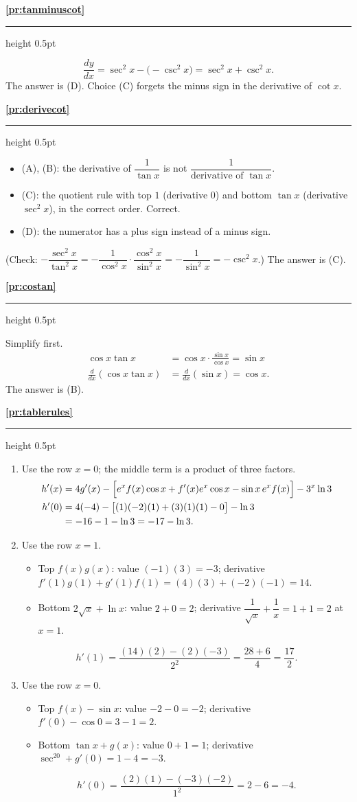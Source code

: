 \documentclass[11pt,a4paper]{article}
\newcommand{\solitem}[2]{%
 \par\addvspace{16pt}\Needspace{10\baselineskip}%
 {\large\bfseries \ref{#1}}\par\nobreak\vspace{2pt}%
 {\color{rulegray}\hrule height 0.5pt}\nobreak\vspace{7pt}%
 #2\par}
\begin{document}
\solitem{pr:tanminuscot}{%
\[
\frac{dy}{dx}=\sec^2x-\bigl(-\csc^2x\bigr)=\sec^2x+\csc^2x.
\]
The answer is (D). Choice (C) forgets the minus sign in the derivative of $\cot x$.
}

\solitem{pr:derivecot}{%
\begin{itemize}
 \item (A), (B): the derivative of $\dfrac{1}{\tan x}$ is not $\dfrac{1}{\text{derivative of }\tan x}$.
 \item (C): the quotient rule with top $1$ (derivative $0$) and bottom $\tan x$ (derivative $\sec^2x$), in the correct order. Correct.
 \item (D): the numerator has a plus sign instead of a minus sign.
\end{itemize}
(Check: $-\dfrac{\sec^2x}{\tan^2x}=-\dfrac{1}{\cos^2x}\cdot\dfrac{\cos^2x}{\sin^2x}=-\dfrac{1}{\sin^2x}=-\csc^2x$.) The answer is (C).
}

\solitem{pr:costan}{%
Simplify first.
\begin{align*}
\cos x\tan x&=\cos x\cdot\frac{\sin x}{\cos x}=\sin x\\
\frac{d}{dx}(\cos x\tan x)&=\frac{d}{dx}(\sin x)=\cos x.
\end{align*}
The answer is (B).
}

\solitem{pr:tablerules}{%
\begin{enumerate}[label=(\alph*)]
 \item Use the row $x=0$; the middle term is a product of three factors.
 \begin{align*}
 h'(x)&=4g'(x)-\Bigl[e^xf(x)\cos x+f'(x)e^x\cos x-\sin x\,e^xf(x)\Bigr]-3^x\ln3\\
 h'(0)&=4(-4)-\bigl[(1)(-2)(1)+(3)(1)(1)-0\bigr]-\ln3\\
 &=-16-1-\ln3=-17-\ln3.
 \end{align*}
 \item Use the row $x=1$.
 \begin{itemize}
  \item Top $f(x)g(x)$: value $(-1)(3)=-3$; derivative $f'(1)g(1)+g'(1)f(1)=(4)(3)+(-2)(-1)=14$.
  \item Bottom $2\sqrt x+\ln x$: value $2+0=2$; derivative $\dfrac{1}{\sqrt x}+\dfrac1x=1+1=2$ at $x=1$.
 \end{itemize}
 \[
 h'(1)=\frac{(14)(2)-(2)(-3)}{2^2}=\frac{28+6}{4}=\frac{17}{2}.
 \]
 \item Use the row $x=0$.
 \begin{itemize}
  \item Top $f(x)-\sin x$: value $-2-0=-2$; derivative $f'(0)-\cos0=3-1=2$.
  \item Bottom $\tan x+g(x)$: value $0+1=1$; derivative $\sec^20+g'(0)=1-4=-3$.
 \end{itemize}
 \[
 h'(0)=\frac{(2)(1)-(-3)(-2)}{1^2}=2-6=-4.
 \]
\end{enumerate}
}
\end{document}
